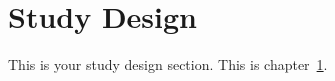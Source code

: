 \chapter{Study Design}
\label{ch:design}

This is your study design section. This is chapter~\ref{ch:design}.